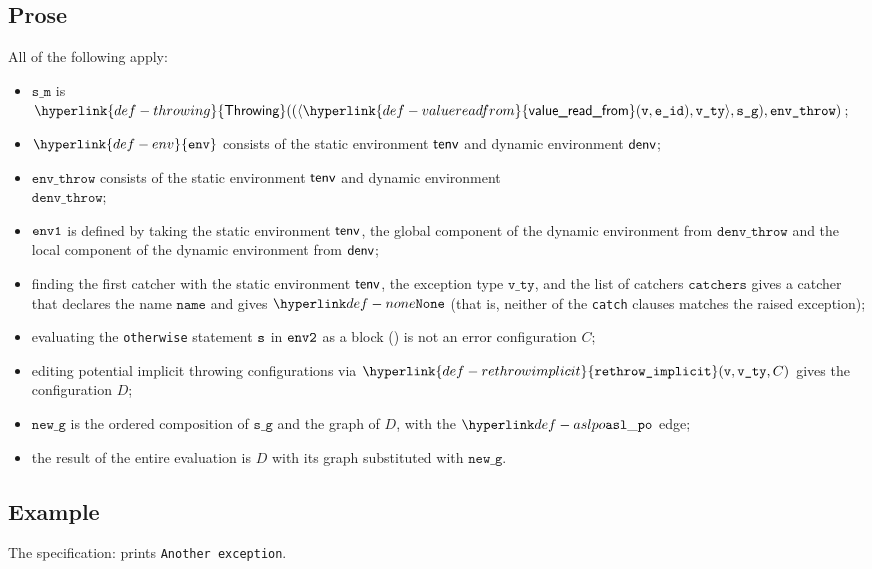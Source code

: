 \documentclass{book}
\newcommand\ErrorConfig[0]{\hyperlink{def-errorconfig}{\texttt{\#DE}}}
\newcommand\ProseOrError[0]{\ProseTerminateAs{\ErrorConfig}}
\newcommand\rethrowimplicit[0]{\hyperlink{def-rethrowimplicit}{\texttt{rethrow\_implicit}}}
\newcommand\valuereadfrom[0]{\hyperlink{def-valuereadfrom}{\textsf{value\_read\_from}}}
\newcommand\Throwing[0]{\hyperlink{def-throwing}{\textsf{Throwing}}}
\newcommand\env[0]{\hyperlink{def-env}{\texttt{env}}}
\newcommand\newg[0]{\texttt{new\_g}}
\newcommand\name[0]{\texttt{name}}
\newcommand\catchers[0]{\texttt{catchers}}
\newcommand\envthrow[0]{\texttt{env\_throw}}
\newcommand\denvthrow[0]{\texttt{denv\_throw}}
\newcommand\sm[0]{\texttt{s\_m}}
\newcommand\sg[0]{\texttt{s\_g}}
\newcommand\vvty[0]{\texttt{v\_ty}}
\newcommand\eid[0]{\texttt{e\_id}}
\begin{document}
  \subsection{Prose}
  All of the following apply:
  \begin{itemize}
    \item $\sm$ is $\Throwing((\langle \valuereadfrom(\vv, \eid), \vvty \rangle, \sg), \envthrow)$;
    \item $\env$ consists of the static environment $\textsf{tenv}$ and dynamic environment $\textsf{denv}$;
    \item $\envthrow$ consists of the static environment $\textsf{tenv}$ and dynamic environment \\ $\denvthrow$;
    \item $\texttt{env1}$ is defined by taking the static environment $\textsf{tenv}$, the global component of the dynamic
    environment from $\denvthrow$ and the local component of the dynamic environment from $\textsf{denv}$;
    \item finding the first catcher with the static environment $\textsf{tenv}$, the exception type $\vvty$,
    and the list of catchers $\catchers$ gives a catcher that declares the name $\name$ and gives $\None$
    (that is, neither of the \texttt{catch} clauses matches the raised exception);
    \item evaluating the \texttt{otherwise} statement $\texttt{s}$ in $\texttt{env2}$ as a block ()
    is not an error configuration $C$\ProseOrError;
    \item editing potential implicit throwing configurations via $\rethrowimplicit(\vv, \vvty, C)$
    gives the configuration $D$;
    \item $\newg$ is the ordered composition of $\sg$ and the graph of $D$,
    with the $\aslpo$ edge;
    \item the result of the entire evaluation is $D$ with its graph substituted with $\newg$.
  \end{itemize}

    \subsection{Example}
     The specification:
     prints \texttt{Another exception}.

\end{document}

